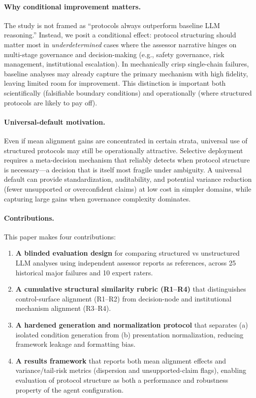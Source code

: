 \paragraph{Why conditional improvement matters.}
The study is not framed as ``protocols always outperform baseline LLM reasoning.'' Instead, we posit a conditional effect: protocol structuring should matter most in \emph{underdetermined} cases where the assessor narrative hinges on multi-stage governance and decision-making (e.g., safety governance, risk management, institutional escalation). In mechanically crisp single-chain failures, baseline analyses may already capture the primary mechanism with high fidelity, leaving limited room for improvement. This distinction is important both scientifically (falsifiable boundary conditions) and operationally (where structured protocols are likely to pay off).

\paragraph{Universal-default motivation.}
Even if mean alignment gains are concentrated in certain strata, universal use of structured protocols may still be operationally attractive. Selective deployment requires a meta-decision mechanism that reliably detects when protocol structure is necessary---a decision that is itself most fragile under ambiguity. A universal default can provide standardization, auditability, and potential variance reduction (fewer unsupported or overconfident claims) at low cost in simpler domains, while capturing large gains when governance complexity dominates.

\paragraph{Contributions.}
This paper makes four contributions:
\begin{enumerate}
    \item \textbf{A blinded evaluation design} for comparing structured vs unstructured LLM analyses using independent assessor reports as references, across 25 historical major failures and 10 expert raters.
    \item \textbf{A cumulative structural similarity rubric (R1--R4)} that distinguishes control-surface alignment (R1--R2) from decision-node and institutional mechanism alignment (R3--R4).
    \item \textbf{A hardened generation and normalization protocol} that separates (a) isolated condition generation from (b) presentation normalization, reducing framework leakage and formatting bias.
    \item \textbf{A results framework} that reports both mean alignment effects and variance/tail-risk metrics (dispersion and unsupported-claim flags), enabling evaluation of protocol structure as both a performance and robustness property of the agent configuration.
\end{enumerate}

